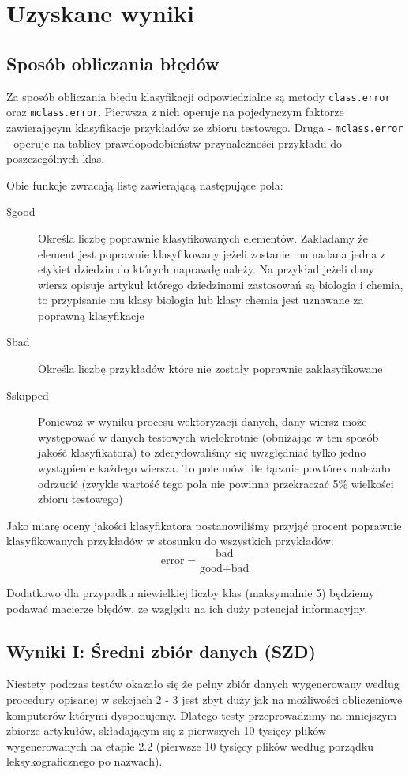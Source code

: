 \documentclass[a4paper,12pt]{article}
\begin{document}
\section{Uzyskane wyniki}

	\subsection{Sposób obliczania błędów}
	
		Za sposób obliczania błędu klasyfikacji 
		odpowiedzialne są metody \texttt{class.error} oraz
		\texttt{mclass.error}. Pierwsza z nich operuje na
		pojedynczym faktorze zawierającym klasyfikacje 
		przykładów ze zbioru testowego. Druga - \texttt{mclass.error} - 
		operuje na tablicy prawdopodobieństw przynależności przykładu
		do poszczególnych klas.
		
		Obie funkcje zwracają listę zawierającą następujące pola:
		\begin{description}
			\item[\$good] 
				Określa liczbę poprawnie klasyfikowanych elementów.
				Zakładamy że element jest poprawnie klasyfikowany 
				jeżeli zostanie mu nadana jedna z etykiet dziedzin
				do których naprawdę należy. Na przykład jeżeli
				dany wiersz opisuje artykuł którego dziedzinami
				zastosowań są biologia i chemia, to przypisanie 
				mu klasy biologia lub klasy chemia jest uznawane 
				za poprawną klasyfikacje
			\item[\$bad]
				Określa liczbę przykładów które nie zostały poprawnie
				zaklasyfikowane
			\item[\$skipped]
				Ponieważ w wyniku procesu wektoryzacji danych, dany 
				wiersz może występować w danych testowych wielokrotnie
				(obniżając w ten sposób jakość klasyfikatora) to zdecydowaliśmy
				się uwzględniać tylko jedno wystąpienie każdego wiersza.
				To pole mówi ile łącznie powtórek należało odrzucić
				(zwykle wartość tego pola nie powinna przekraczać 5\% wielkości
				zbioru testowego)
		\end{description}

		Jako miarę oceny jakości klasyfikatora postanowiliśmy przyjąć
		procent poprawnie klasyfikowanych przykładów w stosunku do 
		wszystkich przykładów:
		\[ \text{error} = \frac{\text{bad}}{\text{good}+\text{bad}} \]
		
		Dodatkowo dla przypadku niewielkiej liczby klas (maksymalnie 5)
		będziemy podawać macierze błędów, ze względu na ich 
		duży potencjał informacyjny.
		
	\subsection{Wyniki I: Średni zbiór danych (SZD)}
		Niestety podczas testów okazało się że pełny zbiór danych
		wygenerowany według procedury opisanej w sekcjach 2 - 3 jest
		zbyt duży jak na możliwości obliczeniowe komputerów którymi dysponujemy.
		Dlatego testy przeprowadzimy na mniejszym zbiorze
		artykułów, składającym się z pierwszych 10 tysięcy plików
		wygenerowanych na etapie 2.2 (pierwsze 10 tysięcy plików według
		porządku leksykograficznego po nazwach).
		
\end{document}
